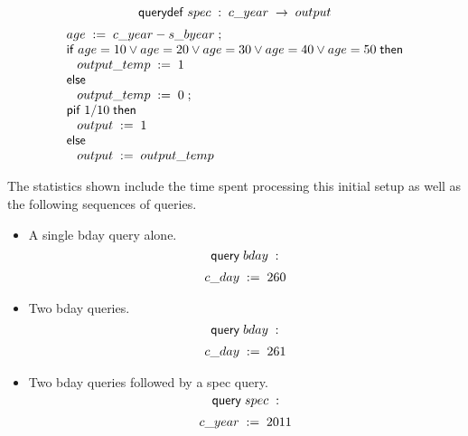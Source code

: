 $$ \mathsf{querydef} \; spec \; : \;c\text{\_}year \; \rightarrow \; output$$
\begin{displaymath}{\small
\begin{array}{l}
  \sassign{age}{\ebinop{-}{c\text{\_}year}{s\text{\_}byear}}\; ;\\
  \sifk \; \ebinop{\vee}{\ebinop{\vee}{\ebinop{\vee}{\ebinop{\vee}{\ebinop{=}{age}{10}}{\ebinop{=}{age}{20}}}{\ebinop{=}{age}{30}}}{\ebinop{=}{age}{40}}}{\ebinop{=}{age}{50}} \; \sthenk\\
  \;\;\;\sassign{output\text{\_}temp}{1}\\
  \selsek\\
  \;\;\;\sassign{output\text{\_}temp}{0}\; ;\\
  \spifk\; 1/10 \; \sthenk\\
  \;\;\;\sassign{output}{1}\\
  \selsek\\
  \;\;\;\sassign{output}{output\text{\_}temp}\\
\end{array}
}\end{displaymath}

The statistics shown include the time spent processing this initial
setup as well as the following sequences of queries.

\begin{itemize}
\item{} A single bday query alone.
$$ \mathsf{query} \; bday \; : $$
\begin{displaymath}{\small
\begin{array}{l}
  \sassign{c\text{\_}day}{260}\\
\end{array}
}\end{displaymath}

\item{} Two bday queries.
$$ \mathsf{query} \; bday \; : $$
\begin{displaymath}{\small
\begin{array}{l}
  \sassign{c\text{\_}day}{261}\\
\end{array}
}\end{displaymath}

\item{} Two bday queries followed by a spec query.
$$ \mathsf{query} \; spec \; : $$
\begin{displaymath}{\small
\begin{array}{l}
  \sassign{c\text{\_}year}{2011}\\
\end{array}
}\end{displaymath}

\end{itemize}

